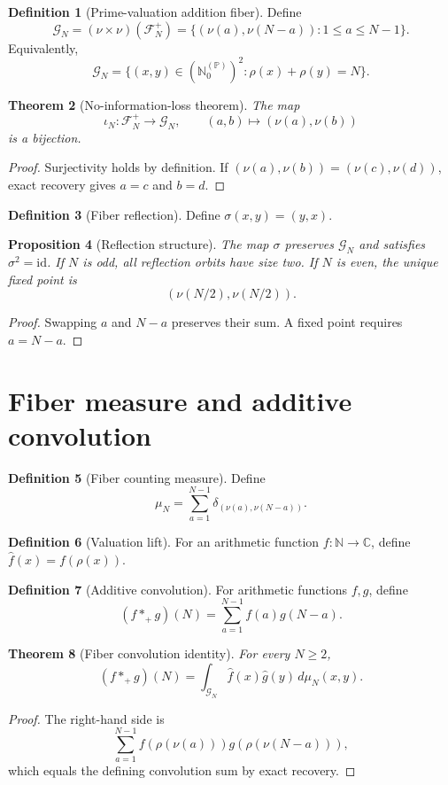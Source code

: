 \documentclass[11pt]{article}
\newtheorem{theorem}{Theorem}[section]
\newtheorem{proposition}[theorem]{Proposition}
\theoremstyle{definition}
\newtheorem{definition}[theorem]{Definition}
\newcommand{\N}{\mathbb N}
\newcommand{\C}{\mathbb C}
\newcommand{\Pp}{\mathbb P}
\newcommand{\F}{\mathcal F}
\newcommand{\G}{\mathcal G}
\begin{document}
\begin{definition}[Prime-valuation addition fiber]
Define
\[
\G_N=(\nu\times\nu)(\F_N^+)=\{(\nu(a),\nu(N-a)):1\le a\le N-1\}.
\]
Equivalently,
\[
\G_N=\{(x,y)\in(\N_0^{(\Pp)})^2:\rho(x)+\rho(y)=N\}.
\]
\end{definition}

\begin{theorem}[No-information-loss theorem]
The map
\[
\iota_N:\F_N^+\longrightarrow\G_N,\qquad (a,b)\longmapsto(\nu(a),\nu(b))
\]
is a bijection.
\end{theorem}
\begin{proof}
Surjectivity holds by definition. If $(\nu(a),\nu(b))=(\nu(c),\nu(d))$, exact recovery gives $a=c$ and $b=d$.
\end{proof}

\begin{definition}[Fiber reflection]
Define $\sigma(x,y)=(y,x)$.
\end{definition}

\begin{proposition}[Reflection structure]
The map $\sigma$ preserves $\G_N$ and satisfies $\sigma^2=\mathrm{id}$. If $N$ is odd, all reflection orbits have size two. If $N$ is even, the unique fixed point is
\[
(\nu(N/2),\nu(N/2)).
\]
\end{proposition}
\begin{proof}
Swapping $a$ and $N-a$ preserves their sum. A fixed point requires $a=N-a$.
\end{proof}

\section{Fiber measure and additive convolution}
\begin{definition}[Fiber counting measure]
Define
\[
\mu_N=\sum_{a=1}^{N-1}\delta_{(\nu(a),\nu(N-a))}.
\]
\end{definition}

\begin{definition}[Valuation lift]
For an arithmetic function $f:\N\to\C$, define $\widehat f(x)=f(\rho(x))$.
\end{definition}

\begin{definition}[Additive convolution]
For arithmetic functions $f,g$, define
\[
(f*_+g)(N)=\sum_{a=1}^{N-1}f(a)g(N-a).
\]
\end{definition}

\begin{theorem}[Fiber convolution identity]
For every $N\ge2$,
\[
(f*_+g)(N)=\int_{\G_N}\widehat f(x)\widehat g(y)\,d\mu_N(x,y).
\]
\end{theorem}
\begin{proof}
The right-hand side is
\[
\sum_{a=1}^{N-1}f(\rho(\nu(a)))g(\rho(\nu(N-a))),
\]
which equals the defining convolution sum by exact recovery.
\end{proof}
\end{document}
